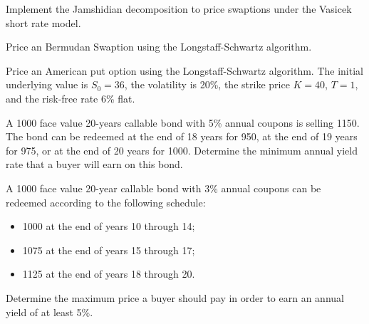 \documentclass[12pt,a4paper]{book}
\begin{document}
\begin{exercise}[subtitle=Jamshidian Trick (\texttt{python})]
Implement the Jamshidian decomposition to price swaptions under the Vasicek short rate model.
\end{exercise}

\begin{exercise}[subtitle=Longstaff and Schwartz (\texttt{python})]
Price an Bermudan Swaption using the Longstaff-Schwartz algorithm. %
\end{exercise}

\begin{exercise}[subtitle=Longstaff and Schwartz (\texttt{python})]
Price an American put option using the Longstaff-Schwartz algorithm. The initial underlying value is $S_0=36$, the volatility is 20\%, the strike price $K=40$, $T=1$, and the risk-free rate 6\% flat.	
\end{exercise}

\begin{exercise}[subtitle=Callable Bond (\texttt{python})]
A 1000 face value 20-years callable bond with 5\% annual coupons is selling 1150. The bond can be redeemed at the end of 18 years for 950, at the end of 19 years for 975, or at the end of 20 years for 1000. Determine the minimum annual yield rate that a buyer will earn on this bond.
\end{exercise}

\begin{exercise}[subtitle=Callable Bond (\texttt{python})]
A 1000 face value 20-year callable bond with 3\% annual coupons can be redeemed according to the following schedule:
\begin{itemize}
	\item 1000 at the end of years 10 through 14;
	\item 1075 at the end of years 15 through 17;
	\item 1125 at the end of years 18 through 20.
\end{itemize}
Determine the maximum price a buyer should pay in order to earn an annual yield of at least 5\%.
\end{exercise}
\end{document}
